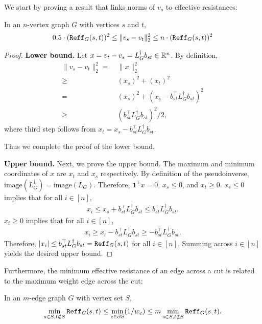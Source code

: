We start by proving a result that links norms of $v_s$ to effective resistances:

\begin{proposition}\label{prop:res2-res}
In an $n$-vertex graph $G$ with vertices $s$ and $t$,
\begin{align*}
0.5 \cdot (\mathtt{Reff}_G(s,t))^2 \le \|v_s - v_t\|_2^2 \le n \cdot (\mathtt{Reff}_G(s,t))^2
\end{align*}
\end{proposition}

\begin{proof}

{\bf Lower bound.}
Let $x = v_t - v_s = L_G^{\dagger} b_{st} \in {\mathbb R}^n$. By definition,
\begin{align*}
\| v_s - v_t \|_2^2 
= & ~ \| x \|_2^2\\
\ge & ~ (x_s)^2 + (x_t)^2\\
= & ~ (x_s)^2 + (x_s - b_{st}^\top L_G^{\dagger} b_{st})^2\\
\ge & ~ (b_{st}^\top L_G^{\dagger} b_{st})^2/2,
\end{align*}
where third step follows from $x_t = x_s - b_{st}^\top L_G^\dagger b_{st}$.

Thus we complete the proof of the lower bound.

{\bf Upper bound.}
Next, we prove the upper bound. The maximum and minimum coordinates of $x$ are $x_t$ and $x_s$ respectively. By definition of the pseudoinverse, $\text{image}(L_G^{\dagger}) = \text{image}(L_G)$. Therefore, $\textbf{1}^\top x = 0$, $x_s \le 0$, and $x_t \ge 0$. $x_s \le 0$ implies that for all $i\in [n]$, 
\begin{align*}
x_i \le x_s + b_{st}^\top L_G^{\dagger} b_{st} \le b_{st}^\top L_G^{\dagger} b_{st}.
\end{align*}
$x_t \ge 0$ implies that for all $i\in [n]$, 
\begin{align*}
x_i \ge x_t - b_{st}^\top L_G^{\dagger} b_{st} \ge -b_{st}^\top L_G^{\dagger} b_{st}.
\end{align*}
Therefore, $|x_i|\le b_{st}^\top L_G^{\dagger} b_{st} = \mathtt{Reff}_G(s,t)$ for all $i\in [n]$. Summing across $i\in [n]$ yields the desired upper bound.
\end{proof}

Furthermore, the minimum effective resistance of an edge across a cut is related to the maximum weight edge across the cut:

\begin{proposition}\label{prop:weight-res}
In an $m$-edge graph $G$ with vertex set $S$,
\begin{align*}
\min_{s\in S,t\notin S} \mathtt{Reff}_G(s,t)\le \min_{e\in \partial S} (1/w_e)\le m \min_{s\in S,t\notin S} \mathtt{Reff}_G(s,t) .
\end{align*}
\end{proposition}

